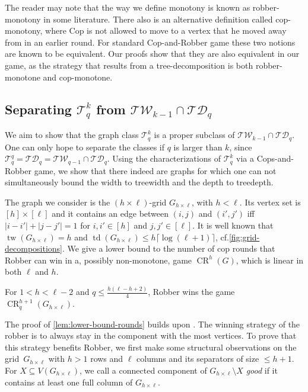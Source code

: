 \documentclass{lmcs}
\theoremstyle{plain}\newtheorem{claim}[thm]{Claim}   %
\newcommand{\cT}{\ensuremath{\mathcal T}}
\DeclareMathOperator{\tw}{tw}
\DeclareMathOperator{\td}{td}
\DeclareMathOperator{\CR}{CR}
\newcommand{\TW}{\ensuremath{\mathcal{TW}}}
\newcommand{\TD}{\ensuremath{\mathcal{TD}}}
\newcommand{\Ekq}{\ensuremath{\cT_{q}^{k}}}
\newcommand{\EParam}[2]{\ensuremath{\cT_{#2}^{#1}}}
\newcommand{\grid}[2]{\ensuremath{G_{#1 \times #2}}}
\begin{document}
The reader may note that the way we define monotony is known as robber-monotony in some literature.
There also is an alternative definition called cop-monotony, where Cop is not allowed to move to a vertex that he moved away from in an earlier round.
For standard Cop-and-Robber game these two notions are known to be equivalent.
Our proofs show that they are also equivalent in our game, as the strategy that results from a tree-decomposition is both robber-monotone and cop-monotone.

\newcommand{\numberOfRoundsK}{\ensuremath{\frac{(k-1)(\ell - (k-1) + 2)}{4}}}
\newcommand{\sizeLargeComponent}{\ensuremath{\frac{\ell h - h - 2}{2}}}
\newcommand{\sizeNonGood}{\ensuremath{\frac{(h-1)(h+2)}{2}}}
\newcommand{\boundL}{\ensuremath{\lceil \frac{q}{k-1}\rceil (k+4)}}

\subsection{Separating \texorpdfstring{$\Ekq$}{Ekq} from \texorpdfstring{$\TW_{k-1} \cap \TD_q$}{TWk-1 intersection TDq}}

We aim to show that the graph class $\Ekq$ is a proper subclass of $\TW_{k-1} \cap \TD_q$.
One can only hope to separate the classes if $q$ is larger than $k$, since $\EParam{q}{q}=\TD_q=\TW_{q-1}\cap\TD_q$.
Using the characterizations of $\Ekq$ via a Cops-and-Robber game, we show that there indeed are graphs for which one can not simultaneously bound the width to treewidth and the depth to treedepth.

The graph we consider is the $(h\times\ell)$-grid \grid{h}{\ell}, with $h<\ell$. 
Its vertex set is $[h] \times [\ell]$ and it contains an edge between $(i,j)$ and $(i',j')$ iff $|i-i'| + |j-j'| = 1$ for $i,i' \in [h]$ and $j,j' \in [\ell]$.
It is well known that $\tw(\grid{h}{\ell})=h$ and $\td(\grid{h}{\ell})\leq h \lceil\log(\ell+1)\rceil$, cf.\@ \autoref{fig:grid-decompositions}. We give a lower bound to the number of cop rounds that Robber can win in a, possibly non-monotone, game $\CR^h(G)$, which is linear in both $\ell$ and $h$.

\begin{lem}
	\label{lem:lower-bound-rounds}
	For $1<h<\ell-2$ and $q\leq\frac{h(\ell  - h + 2)}{4}$, Robber wins the game $\CR_q^{h+1}(\grid{h}{\ell})$.
\end{lem}

The proof of \autoref{lem:lower-bound-rounds} builds upon \cite{Furer_rounds_2001}.
The winning strategy of the robber is to always stay in the component with the most vertices.
To prove that this strategy benefits Robber, we first make some structural observations on the grid~\grid{h}{\ell} with $h>1$ rows and $\ell$ columns and its separators of size $\leq h+1$.
For $X\subseteq V(\grid{h}{\ell})$, we call a connected component of $\grid{h}{\ell}\setminus X$ \emph{good} if it contains at least one full column of \grid{h}{\ell}.
\end{document}
